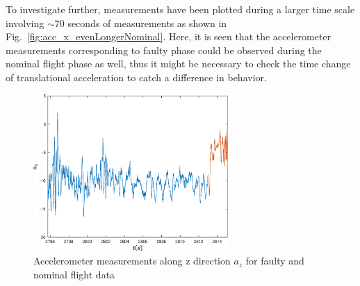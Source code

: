 



To investigate further, measurements have been plotted during a larger time scale involving $\sim$70 seconds of measurements as shown in Fig.~\ref{fig:acc_x_evenLongerNominal}. 
Here, it is seen that the accelerometer measurements corresponding to faulty phase could be observed during the nominal flight phase as well, thus it might be necessary to check the time change of translational acceleration to catch a difference in behavior. 

\begin{figure}
\begin{center}
\includegraphics[width=0.66\textwidth]{figures/acc_z}    %
\caption{Accelerometer measurements along z direction $a_z$ for faulty and nominal flight data} 
\label{fig:acc_z}
\end{center}
\end{figure}

